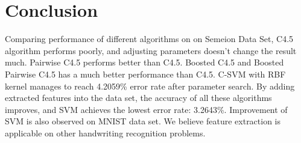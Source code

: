 \documentclass[a4paper,11pt]{nurop}
\begin{document}
\section{Conclusion}
Comparing performance of different algorithms on on Semeion Data Set, C4.5 algorithm performs poorly, and adjusting parameters doesn't change the result much. Pairwise C4.5 performs better than C4.5. Boosted C4.5 and Boosted Pairwise C4.5 has a much better performance than C4.5. C-SVM with RBF kernel manages to reach 4.2059\% error rate after parameter search. By adding extracted features into the data set, the accuracy of all these algorithms improves, and SVM achieves the lowest error rate: 3.2643\%. Improvement of SVM is also observed on MNIST data set. We believe feature extraction is applicable on other handwriting recognition problems.

\newpage


\end{document}
